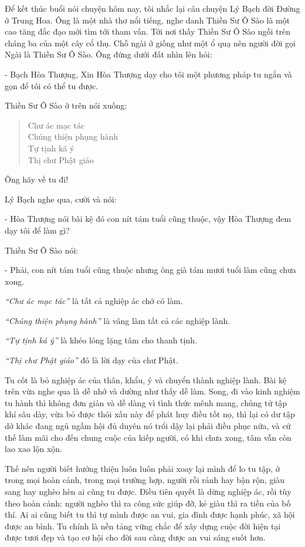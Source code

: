 \documentclass[
  12pt,
  oneside]{book}
\begin{document}
Để kết thúc buổi nói chuyện hôm nay, tôi nhắc lại câu chuyện Lý Bạch đời Đường ở Trung Hoa. Ông là một nhà thơ nổi tiếng, nghe danh Thiền Sư Ô Sào là một cao tăng đắc đạo mới tìm tới tham vấn. Tới nơi thấy Thiền Sư Ô Sào ngồi trên cháng ba của một cây cổ thụ. Chỗ ngài ở giống như một ổ quạ nên người đời gọi Ngài là Thiền Sư Ô Sào. Ông đứng dưới đất nhìn lên hỏi:

- Bạch Hòa Thượng, Xin Hòa Thượng dạy cho tôi một phương pháp tu ngắn và gọn để tôi có thể tu được.

Thiền Sư Ô Sào ở trên nói xuống:

\begin{quote}
Chư ác mạc tác\\
Chúng thiện phụng hành\\
Tự tịnh ká ý\\
Thị chư Phật giáo
\end{quote}

Ông hãy về tu đi!

Lý Bạch nghe qua, cười và nói:

- Hòa Thượng nói bài kệ đó con nít tám tuổi cũng thuộc, vậy Hòa Thượng đem dạy tôi để làm gì?

Thiền Sư Ô Sào nói:

- Phải, con nít tám tuổi cũng thuộc nhưng ông già tám mươi tuổi làm cũng chưa xong.

\emph{``Chư ác mạc tác''} là tất cả nghiệp ác chớ có làm.

\emph{``Chúng thiện phụng hành''} là vâng làm tất cả các nghiệp lành.

\emph{``Tự tịnh ká ý''} là khéo lóng lặng tâm cho thanh tịnh.

\emph{``Thị chư Phật giáo''} đó là lời dạy của chư Phật.

Tu cốt là bỏ nghiệp ác của thân, khẩu, ý và chuyển thành nghiệp lành. Bài kệ trên vừa nghe qua là dễ nhớ và dường như thấy dễ làm. Song, đi vào kinh nghiệm tu hành thì không đơn giản và dễ dàng vì tình thức mênh mang, chủng tử tập khí sâu dày, vừa bỏ được thói xấu này để phát huy điều tốt nọ, thì lại có dư tập dở khác đang ngủ ngầm hội đủ duyên nó trổi dậy lại phải điều phục nữa, và cứ thế làm mãi cho đến chung cuộc của kiếp người, có khi chưa xong, tâm vẫn còn lao xao lộn xộn.

Thế nên người biết hướng thiện luôn luôn phải xoay lại mình để lo tu tập, ở trong mọi hoàn cảnh, trong mọi trường hợp, người rỗi rảnh hay bận rộn, giàu sang hay nghèo hèn ai cũng tu được. Điều tiên quyết là dừng nghiệp ác, rồi tùy theo hoàn cảnh: người nghèo thì ra công sức giúp đỡ, kẻ giàu thì ra tiền của bố thí. Ai ai cũng biết tu thì tự mình được an vui, gia đình được hạnh phúc, xã hội được an bình. Tu chính là nền tảng vững chắc để xây dựng cuộc đời hiện tại được tươi đẹp và tạo cơ hội cho đời sau càng được an vui sáng suốt hơn.
\end{document}
